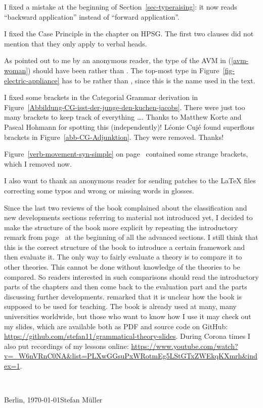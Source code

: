 I fixed a mistake at the beginning of Section~\ref{sec-typeraising}: it now reads ``backward
application'' instead of ``forward application''.

I fixed the Case Principle in the chapter on HPSG. The first two clauses did not mention that they
only apply to verbal heads.

As pointed out to me by an anonymous reader, the type of the AVM in (\ref{avm-woman}) should have
been  rather than . The top-most type in Figure~\ref{fig-electric-appliance} has to be
 rather than , since this is the name used in the text.

I fixed some brackets in the Categorial Grammar derivation in Figure~\ref{Abbildung-CG-isst-der-junge-den-kuchen-jacobs}. There were
just too many brackets to keep track of everything \ldots. Thanks to Matthew Korte and Pascal
Hohmann for spotting this (independently)!
Léonie Cujé found superflous brackets in Figure~\ref{abb-CG-Adjunktion}. They were removed. Thanks!

Figure~\ref{verb-movement-syn-simple} on page~\pageref{verb-movement-syn-simple} contained some strange brackets, which I removed now.

I also want to thank an anonymous reader for sending patches to the \LaTeX{} files correcting some
typos and wrong or missing words in glosses.

Since the last two reviews of the book complained about the classification and new developments
sections referring to material not introduced yet, I decided to make the structure of the book more
explicit by repeating the introductory remark from page~\pageref{page:structure-of-book} at the
beginning of all the advanced sections. I still think that this is the correct structure of the book to introduce a
certain framework and then evaluate it. The only way to fairly evaluate a theory is to compare it to
other theories. This cannot be done without knowledge of the theories to be compared. So readers
interested in such comparisons should read the introductory parts of the chapters and then come back
to the evaluation part and the parts discussing further developments. \citet{Culicover2021a}
remarked that it is unclear how the book is supposed to be used for teaching. The book is already
used at many, many universities worldwide, but those who want to know how I use it may check out my
slides, which are available both as PDF and source code on GitHub:
\url{https://github.com/stefan11/grammatical-theory-slides}. During Corona times I also put
recordings of my lessons online: \url{https://www.youtube.com/watch?v=_W6nVRnC0NA&list=PLXwGGsuPxWRotmEg5LStGTxZWEkqKXmrh&index=1}.

~\medskip

\noindent
Berlin, \today\hfill Stefan Müller



